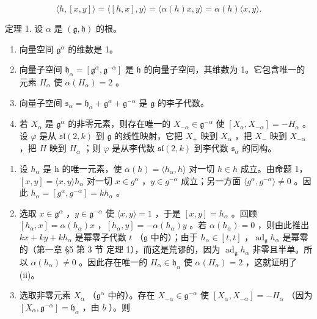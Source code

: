 \[
\langle h, [ x, y ] \rangle = \langle [ h, x ], y \rangle = \langle \alpha (h) x, y \rangle = \alpha (h) \langle x, y \rangle .
\]

定理 1. 设 \(\alpha\) 是 \((\mathfrak{g},\mathfrak{h})\) 的根。

\begin{enumerate}
\def\labelenumi{(\roman{enumi})}
\item
  向量空间 \(\mathfrak{g}^{\alpha}\) 的维数是 1。
\item
  向量子空间 \(\mathfrak{h}_{\alpha} = [\mathfrak{g}^{\alpha},\mathfrak{g}^{-\alpha}]\) 是 \(\mathfrak{h}\) 的向量子空间，其维数为 1。它包含唯一的元素 \(H_{\alpha}\) 使 \(\alpha (H_{\alpha}) = 2\) 。
\item
  向量子空间 \(\mathfrak{s}_{\alpha} = \mathfrak{h}_{\alpha} + \mathfrak{g}^{\alpha} + \mathfrak{g}^{-\alpha}\) 是 \(\mathfrak{g}\) 的李子代数。
\item
  若 \(X_{\alpha}\) 是 \(\mathfrak{g}^{\alpha}\) 的非零元素，则存在唯一的 \(X_{-\alpha} \in \mathfrak{g}^{-\alpha}\) 使 \([X_{\alpha}, X_{-\alpha}] = -H_{\alpha}\) 。设 \(\varphi\) 是从 \(\mathfrak{sl}(2, k)\) 到 \(\mathfrak{g}\) 的线性映射，它把 \(X_{+}\) 映到 \(X_{\alpha}\) ，把 \(X_{-}\) 映到 \(X_{-\alpha}\) ，把 \(H\) 映到 \(H_{\alpha}\) ；则 \(\varphi\) 是从李代数 \(\mathfrak{sl}(2, k)\) 到李代数 \(\mathfrak{s}_{\alpha}\) 的同构。
\end{enumerate}

\begin{enumerate}
\def\labelenumi{\alph{enumi})}
\item
  设 \(h_{\alpha}\) 是 h 的唯一元素，使 \(\alpha(h) = \langle h_{\alpha}, h \rangle\) 对一切 \(h \in h\) 成立。由命题 1，\([x, y] = \langle x, y \rangle h_{\alpha}\) 对一切 \(x \in g^{\alpha}\) ，\(y \in g^{-\alpha}\) 成立；另一方面 \(\langle g^{\alpha}, g^{-\alpha} \rangle \neq 0\) 。因此 \(h_{\alpha} = [g^{\alpha}, g^{-\alpha}] = kh_{\alpha}\) 。
\item
  选取 \(x \in \mathfrak{g}^{\alpha}\) ，\(y \in \mathfrak{g}^{-\alpha}\) 使 \(\langle x, y \rangle = 1\) ，于是 \([x, y] = h_{\alpha}\) 。回顾 \([h_{\alpha}, x] = \alpha(h_{\alpha})x\) ，\([h_{\alpha}, y] = -\alpha(h_{\alpha})y\) 。若 \(\alpha(h_{\alpha}) = 0\) ，则由此推出 \(kx + ky + kh_{\alpha}\) 是幂零子代数 \(t\) （\(\mathfrak{g}\) 中的）；由于 \(h_{\alpha} \in [t, t]\) ，\(\operatorname{ad}_{\mathfrak{g}} h_{\alpha}\) 是幂零的（第一章 §5 第 3 节 定理 1），而这是荒谬的，因为 \(\operatorname{ad}_{\mathfrak{g}} h_{\alpha}\) 非零且半单。所以 \(\alpha(h_{\alpha}) \neq 0\) 。因此存在唯一的 \(H_{\alpha} \in \mathfrak{h}_{\alpha}\) 使 \(\alpha(H_{\alpha}) = 2\) ，这就证明了 (ii)。
\item
  选取非零元素 \(X_{\alpha}\) （\(\mathfrak{g}^{\alpha}\) 中的）。存在 \(X_{-\alpha} \in \mathfrak{g}^{-\alpha}\) 使 \([X_{\alpha}, X_{-\alpha}] = -H_{\alpha}\) （因为 \([X_{\alpha}, \mathfrak{g}^{-\alpha}] = \mathfrak{h}_{\alpha}\) ，由 \(b\) ）。则
\end{enumerate}

